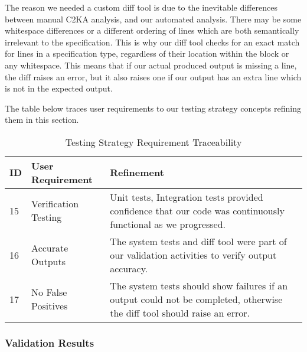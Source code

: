The reason we needed a custom diff tool is due to the inevitable differences between manual C2KA analysis,
and our automated analysis.
There may be some whitespace differences or a different ordering of lines
which are both semantically irrelevant to the specification.
This is why our diff tool checks for an exact match for lines in a specification type,
regardless of their location within the block or any whitespace.
This means that if our actual produced output is missing a line, the diff raises an error,
but it also raises one if our output has an extra line which is not in the expected output.


The table below traces user requirements to our testing strategy concepts refining them in this section.
\begin{table}[htbp]
    \centering
    \caption{Testing Strategy Requirement Traceability}\label{tab:test-strat-table}
    \begin{tabularx}{\textwidth}{| l | l | X |}
        \hline
        \textbf{ID} & \textbf{User Requirement} & \textbf{Refinement} \\
        \hline
        15 & Verification Testing & Unit tests, Integration tests provided confidence that our code was continuously functional as we progressed. \\ \hline
        16 & Accurate Outputs & The system tests and diff tool were part of our validation activities to verify output accuracy. \\ \hline
        17 & No False Positives & The system tests should show failures if an output could not be completed, otherwise the diff tool should raise an error. \\ \hline
    \end{tabularx}
\end{table}
\newpage
\subsubsection{Validation Results}\label{subsubsec:test-validation}

